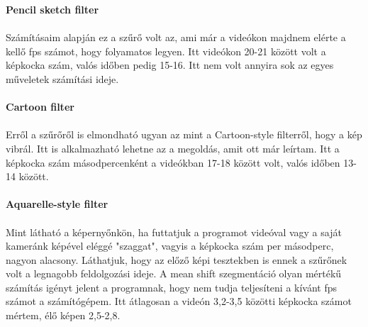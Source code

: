 \textbf{Pencil sketch filter}\\\\
Számításaim alapján ez a szűrő volt az, ami már a videókon majdnem elérte a kellő fps számot, hogy folyamatos legyen. Itt videókon 20-21 között volt a képkocka szám, valós időben pedig 15-16. Itt nem volt annyira sok az egyes műveletek számítási ideje.\\\\
\textbf{Cartoon filter}\\\\
Erről a szűrőről is elmondható ugyan az mint a Cartoon-style filterről, hogy a kép vibrál. Itt is alkalmazható lehetne az a megoldás, amit ott már leírtam. Itt a képkocka szám másodpercenként a videókban 17-18 között volt, valós időben 13-14 között.\\\\
\textbf{Aquarelle-style filter}\\\\
Mint látható a képernyőnkön, ha futtatjuk a programot videóval vagy a saját kameránk képével eléggé "szaggat", vagyis a képkocka szám per másodperc, nagyon alacsony. Láthatjuk, hogy az előző képi tesztekben is ennek a szűrőnek volt a legnagobb feldolgozási ideje. A mean shift szegmentáció olyan mértékű számítás igényt jelent a programnak, hogy nem tudja teljesíteni a kívánt fps számot a számítógépem. Itt átlagosan a videón 3,2-3,5 közötti képkocka számot mértem, élő képen 2,5-2,8.


